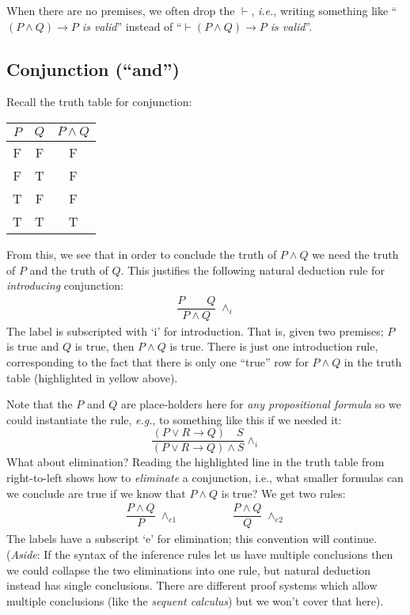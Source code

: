 \documentclass{article}
\theoremstyle{definition}
\newcommand{\ie}{\emph{i.e.}}
\newcommand{\eg}{\emph{e.g.}}
\begin{document}
When there are no premises, we often drop the $\vdash$, \ie{},
writing something like ``\emph{$(P \wedge Q) \rightarrow P$ is valid}''
instead of ``\emph{$\vdash (P \wedge Q) \rightarrow P$ is
valid}''.

\subsection{Conjunction (``and'')}

Recall the truth table for conjunction:
%
\begin{center}
\begin{tabular}{cc|c}
  $P$ & $Q$ & $P \wedge Q$ \\ \hline
  F & F & F \\
  F & T & F \\
  T & F & F \\
\rowcolor{yellow}  T & T & T
\end{tabular}
\end{center}
%
From this, we see that in order to conclude the truth of $P \wedge Q$
we need the truth of $P$ and the truth of $Q$. This justifies the
following natural deduction rule for \emph{introducing} conjunction:
%
\begin{align*}
  \dfrac{P \qquad Q}
        {P \wedge Q} \; {\wedge_i}
\end{align*}
%
The label is subscripted with `i' for introduction.
That is, given two premises; $P$ is true and $Q$ is true, then
$P \wedge Q$ is true. There is just one introduction rule,
corresponding to the fact that there is only one ``true'' row
for $P \wedge Q$ in the truth table (highlighted in yellow above).

Note that the $P$ and $Q$ are place-holders here for \emph{any
  propositional formula} so we could instantiate the rule, \eg{},
to something like this if we needed it:
%
\begin{equation*}
\dfrac{(P \vee R \rightarrow Q) \quad S}
      {(P \vee R \rightarrow Q) \wedge S} {\wedge_i}
\end{equation*}
%
What about elimination?
Reading the highlighted line in the truth table from right-to-left shows how to
\emph{eliminate} a conjunction, i.e., what smaller formulas
can we conclude are true if we know that $P \wedge Q$ is true? We get
two rules:
%
\begin{align*}
  \dfrac{P \wedge Q}
        {P} \; {\wedge_{e1}}
  \qquad & \qquad
      \dfrac{P \wedge Q}
        {Q} \; {\wedge_{e2}}
\end{align*}
%
The labels have a subscript `e' for elimination; this convention will
continue.  (\emph{Aside}: If the syntax of the inference rules let us
have multiple conclusions then we could collapse the two eliminations
into one rule, but natural deduction instead has single
conclusions. There are different proof systems which allow
multiple conclusions (like the \emph{sequent calculus}) but we won't cover that here).
\end{document}
